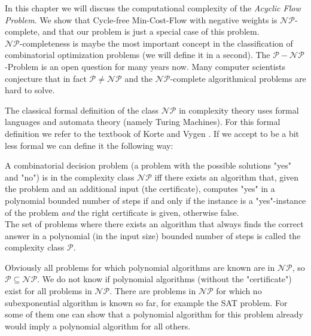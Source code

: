 In this chapter we will discuss the computational complexity of the \textit{Acyclic Flow Problem}. We show that 
Cycle-free Min-Cost-Flow with negative weights is $\mathcal{NP}$-complete, and that our problem is just a special case 
of this problem. \\

$\mathcal{NP}$-completeness is maybe the most important concept in the classification of combinatorial optimization 
problems (we will define it in a second). The $\mathcal{P-NP}$-Problem is an open question for many years now. Many 
computer scientists conjecture that in fact $\mathcal{P}\neq \mathcal{NP}$ and the $\mathcal{NP}$-complete algorithmical 
problems are hard to solve. 

The classical formal definition of the class $\mathcal{NP}$ in complexity theory uses formal languages and automata 
theory (namely Turing Machines). For this formal definition we refer to the textbook of Korte and Vygen 
\cite{KorteVygenCombOpt2007}. If we accept to be a bit less formal we can define it the following way:
\begin{definition}


A combinatorial decision problem (a problem with the possible solutions "yes" and "no") is in the complexity class 
$\mathcal{NP}$ iff there exists an algorithm that, given the problem and an additional input (the certificate), 
computes "yes" in a polynomial bounded number of steps if and only if the instance is a "yes"-instance of the problem 
\textit{and} the right certificate is given, otherwise false.\\
The set of problems where there exists an algorithm that always finds the correct answer in a polynomial (in the input 
size) bounded number of steps is called the complexity class $\mathcal{P}$. 
\end{definition}

Obviously all problems for which polynomial algorithms are known are in $\mathcal{NP}$, so 
$\mathcal{P}\subseteq\mathcal{NP}$. We do not know if polynomial algorithms (without the "certificate") exist for all 
problems in $\mathcal{NP}$. There are problems in $\mathcal{NP}$ for which no subexponential algorithm is known so far, 
for example the SAT problem. For some of them one can show that a polynomial algorithm for this problem already would 
imply a polynomial algorithm for all others. 

